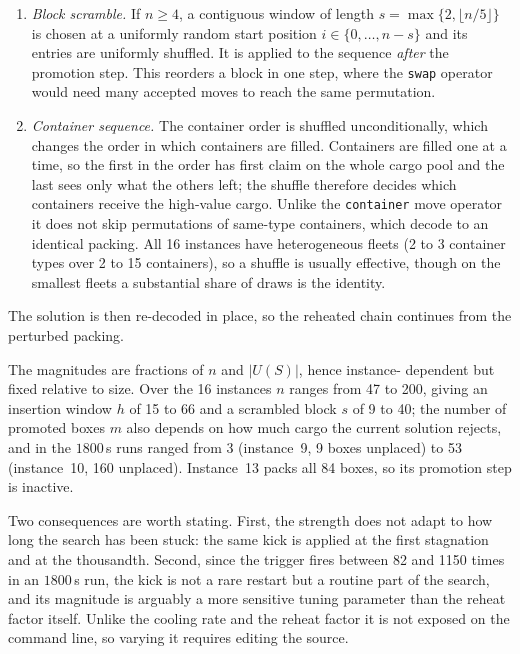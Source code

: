 \begin{enumerate}
\begin{enumerate}
          \item \emph{Block scramble.} If $n \ge 4$, a contiguous window of
                length $s = \max\{2, \lfloor n/5 \rfloor\}$ is chosen at a
                uniformly random start position $i \in \{0,\dots,n-s\}$ and
                its entries are uniformly shuffled. It is applied to the
                sequence \emph{after} the promotion step. This reorders a
                block in one step, where the \texttt{swap} operator would need
                many accepted moves to reach the same permutation.

          \item \emph{Container sequence.} The container order is shuffled
                unconditionally, which changes the order in which containers
                are filled. Containers are filled one at a time, so the first
                in the order has first claim on the whole cargo pool and the
                last sees only what the others left; the shuffle therefore
                decides which containers receive the high-value cargo. Unlike
                the \texttt{container} move operator it does not skip
                permutations of same-type containers, which decode to an
                identical packing. All 16 instances have heterogeneous fleets
                (2 to 3 container types over 2 to 15 containers), so a shuffle
                is usually effective, though on the smallest fleets a
                substantial share of draws is the identity.

        \end{enumerate}
        The solution is then re-decoded in place, so the reheated chain
        continues from the perturbed packing.

        The magnitudes are fractions of $n$ and $|U(S)|$, hence instance-
        dependent but fixed relative to size. Over the 16 instances
        $n$ ranges from 47 to 200, giving an insertion window $h$ of 15 to 66
        and a scrambled block $s$ of 9 to 40; the number of promoted boxes $m$
        also depends on how much cargo the current solution rejects, and in
        the $1800$\,s runs ranged from 3 (instance~9, 9 boxes unplaced) to 53
        (instance~10, 160 unplaced). Instance~13 packs all 84 boxes, so its
        promotion step is inactive.

        Two consequences are worth stating. First, the strength does not adapt
        to how long the search has been stuck: the same kick is applied at the
        first stagnation and at the thousandth. Second, since the trigger
        fires between 82 and 1150 times in an $1800$\,s run, the kick is not a
        rare restart but a routine part of the search, and its magnitude is
        arguably a more sensitive tuning parameter than the reheat factor
        itself. Unlike the cooling rate and the reheat factor it is not
        exposed on the command line, so varying it requires editing the
        source.


\end{enumerate}
